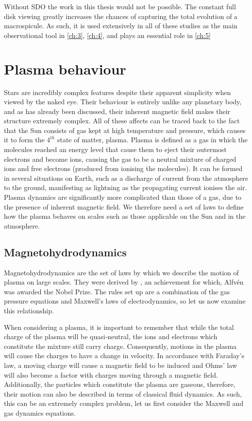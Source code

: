 Without SDO the work in this thesis would not be possible.
The constant full disk viewing greatly increases the chances of capturing the total evolution of a macrospicule.
As such, it is used extensively in all of these studies as the main observational tool in \cref{ch:3}, \cref{ch:4}, and plays an essential role in \cref{ch:5} 


\section{Plasma behaviour}

Stars are incredibly complex features despite their apparent simplicity when viewed by the naked eye.
Their behaviour is entirely unlike any planetary body, and as has already been discussed, their inherent magnetic field makes their structure extremely complex.
All of these affects can be traced back to the fact that the Sun consists of gas kept at high temperature and pressure, which causes it to form the $4^{th}$ state of matter, plasma.
Plasma is defined as a gas in which the molecules reached an energy level that cause them to eject their outermost electrons and become ions, causing the gas to be a neutral mixture of charged ions and free electrons (produced from ionising the molecules).
It can be formed in several situations on Earth, such as a discharge of current from the atmosphere to the ground, manifesting as lightning as the propagating current ionises the air.
Plasma dynamics are significantly more complicated than those of a gas, due to the presence of inherent magnetic field. 
We therefore need a set of laws to define how the plasma behaves on scales such as those applicable on the Sun and in the atmosphere.

\subsection{Magnetohydrodynamics}

Magnetohydrodynamics are the set of laws by which we describe the motion of plasma on large scales.
They were derived by \cite{Alfven1942}, an achievement for which, Alfv{\'e}n was awarded the Nobel Prize.
The rules set up are a combination of the gas pressure equations and Maxwell's laws of electrodynamics, so let us now examine this relationship.

When considering a plasma, it is important to remember that while the total charge of the plasma will be quasi-neutral, the ions and electrons which constitute the mixture still carry charge.
Consequently, motions in the plasma will cause the charges to have a change in velocity.
In accordance with Faraday's law, a moving charge will cause a magnetic field to be induced and Ohms' law will also become a factor with charges moving through a magnetic field.
Additionally, the particles which constitute the plasma are gaseous, therefore, their motion can also be described in terms of classical fluid dynamics.
As such, this can be an extremely complex problem, let us first consider the Maxwell and gas dynamics equations.

